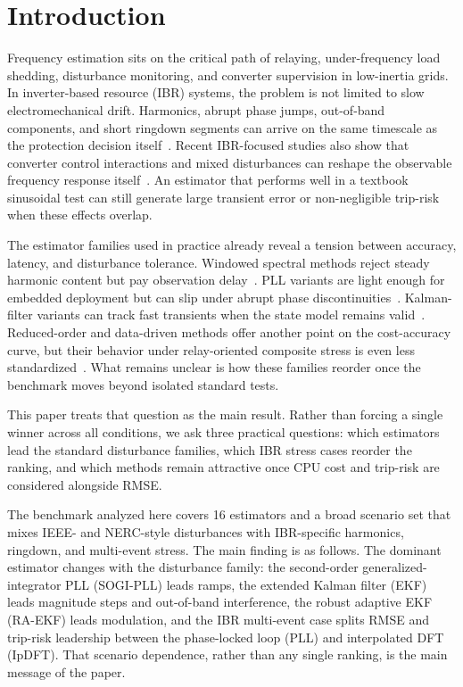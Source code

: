 \section{Introduction}\label{sec:introduction}

Frequency estimation sits on the critical path of relaying, under-frequency
load shedding, disturbance monitoring, and converter supervision in
low-inertia grids. In inverter-based resource (IBR) systems, the problem is
not limited to slow electromechanical drift. Harmonics, abrupt phase jumps,
out-of-band components, and short ringdown segments can arrive on the same
timescale as the protection decision itself~\cite{Milano2018LowInertia,
Pinheiro2025,Ponce2025}. Recent IBR-focused studies also show that converter
control interactions and mixed disturbances can reshape the observable
frequency response itself~\cite{Bernal2025,Zoghby2024}. An estimator that
performs well in a textbook sinusoidal test can still generate large transient
error or non-negligible trip-risk when these effects overlap.

The estimator families used in practice already reveal a tension between
accuracy, latency, and disturbance tolerance. Windowed spectral methods reject
steady harmonic content but pay observation delay~\cite{Belega2014,
PlatasGarza2011}. PLL variants are light enough for embedded deployment but can
slip under abrupt phase discontinuities~\cite{Golestan2017,Wright2019}.
Kalman-filter variants can track fast transients when the state model remains
valid~\cite{Ferrero2020EKF,Chamorro2021}. Reduced-order and data-driven methods
offer another point on the cost-accuracy curve, but their behavior under
relay-oriented composite stress is even less standardized~\cite{Netto2018KoopmanKF,
Ting2022}. What remains unclear is how these families reorder once the
benchmark moves beyond isolated standard tests.

This paper treats that question as the main result. Rather than forcing a
single winner across all conditions, we ask three practical questions: which
estimators lead the standard disturbance families, which IBR stress cases
reorder the ranking, and which methods remain attractive once CPU cost and
trip-risk are considered alongside RMSE.

The benchmark analyzed here covers 16 estimators and a broad scenario set
that mixes IEEE- and NERC-style disturbances with IBR-specific harmonics,
ringdown, and multi-event stress. The main finding is as follows. The dominant
estimator changes with the disturbance family: the second-order
generalized-integrator PLL (SOGI-PLL) leads ramps, the extended Kalman filter
(EKF) leads magnitude steps and out-of-band interference, the robust adaptive
EKF (RA-EKF) leads modulation, and the IBR multi-event case splits RMSE and
trip-risk leadership between the phase-locked loop (PLL) and interpolated DFT
(IpDFT). That scenario dependence, rather than any single ranking, is the
main message of the paper.
